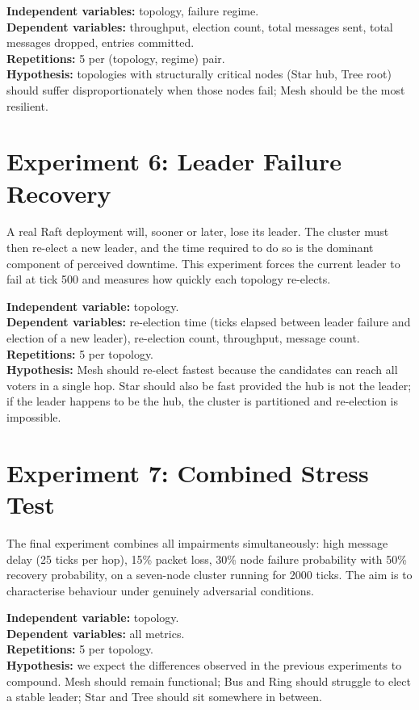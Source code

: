 \textbf{Independent variables:} topology, failure regime.\\
\textbf{Dependent variables:} throughput, election count, total messages sent, total messages dropped, entries committed.\\
\textbf{Repetitions:} 5 per (topology, regime) pair.\\
\textbf{Hypothesis:} topologies with structurally critical nodes (Star hub, Tree root) should suffer disproportionately when those nodes fail; Mesh should be the most resilient.

\section{Experiment 6: Leader Failure Recovery}
\label{sec:exp6}

A real Raft deployment will, sooner or later, lose its leader. The cluster must then re-elect a new leader, and the time required to do so is the dominant component of perceived downtime. This experiment forces the current leader to fail at tick 500 and measures how quickly each topology re-elects.

\textbf{Independent variable:} topology.\\
\textbf{Dependent variables:} re-election time (ticks elapsed between leader failure and election of a new leader), re-election count, throughput, message count.\\
\textbf{Repetitions:} 5 per topology.\\
\textbf{Hypothesis:} Mesh should re-elect fastest because the candidates can reach all voters in a single hop. Star should also be fast provided the hub is not the leader; if the leader happens to be the hub, the cluster is partitioned and re-election is impossible.

\section{Experiment 7: Combined Stress Test}
\label{sec:exp7}

The final experiment combines all impairments simultaneously: high message delay (25 ticks per hop), 15\% packet loss, 30\% node failure probability with 50\% recovery probability, on a seven-node cluster running for 2000 ticks. The aim is to characterise behaviour under genuinely adversarial conditions.

\textbf{Independent variable:} topology.\\
\textbf{Dependent variables:} all metrics.\\
\textbf{Repetitions:} 5 per topology.\\
\textbf{Hypothesis:} we expect the differences observed in the previous experiments to compound. Mesh should remain functional; Bus and Ring should struggle to elect a stable leader; Star and Tree should sit somewhere in between.

